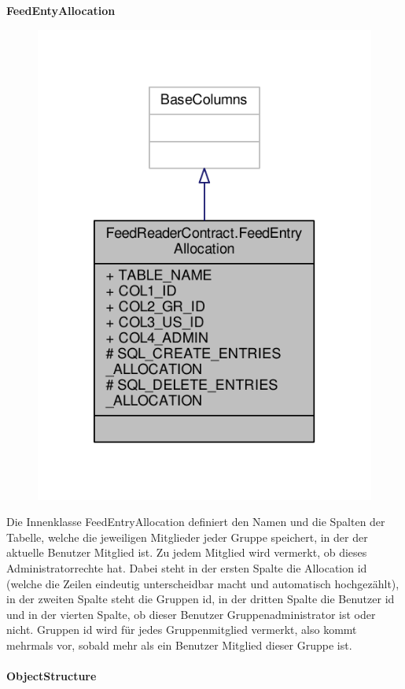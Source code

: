 \textbf{FeedEntyAllocation}
\begin{figure}[H]
	\includegraphics[scale = 1]{res/umlClasses/feed_reader_contract_allocation.pdf}
	\centering
\end{figure}
Die Innenklasse FeedEntryAllocation definiert den Namen und die Spalten der Tabelle, welche die jeweiligen Mitglieder jeder Gruppe speichert, in der der aktuelle Benutzer Mitglied ist. Zu jedem Mitglied wird vermerkt, ob dieses Administratorrechte hat.
Dabei steht in der ersten Spalte die Allocation id (welche die Zeilen eindeutig unterscheidbar macht und automatisch hochgezählt), in der zweiten Spalte steht die Gruppen id, in der dritten Spalte die Benutzer id und in der vierten Spalte, ob dieser Benutzer Gruppenadministrator ist oder nicht. 
Gruppen id wird für jedes Gruppenmitglied vermerkt, also kommt mehrmals vor, sobald mehr als ein Benutzer Mitglied dieser Gruppe ist.


\paragraph{ObjectStructure}

